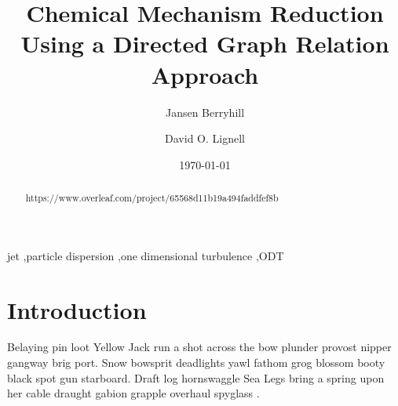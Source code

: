\documentclass[review,3p]{elsarticle}
\begin{document}


\title{Chemical Mechanism Reduction Using a Directed Graph Relation Approach} 

\author[byu]{Jansen Berryhill}
\author[byu]{David O. Lignell}

\address[byu]{350 CB, Brigham Young University, Provo, UT 84602, USA}


\date{\today}


\begin{abstract}
https://www.overleaf.com/project/65568d11b19a494faddfef8b
\lipsum[1]     %

\end{abstract}

\begin{keyword} 
jet \sep particle dispersion \sep one dimensional turbulence \sep ODT
\end{keyword}


\maketitle     


\linenumbers

\section{Introduction}      \label{sec:intro}

\lipsum[2]     %

Belaying pin loot Yellow Jack run a shot across the bow plunder provost nipper gangway brig port. Snow bowsprit deadlights yawl \cite{Lignell_2011} fathom grog blossom booty black spot gun starboard. Draft log hornswaggle Sea Legs bring a spring upon her cable draught gabion grapple overhaul spyglass \cite{Ferziger_2002, Cantera_new}.
\end{document}
